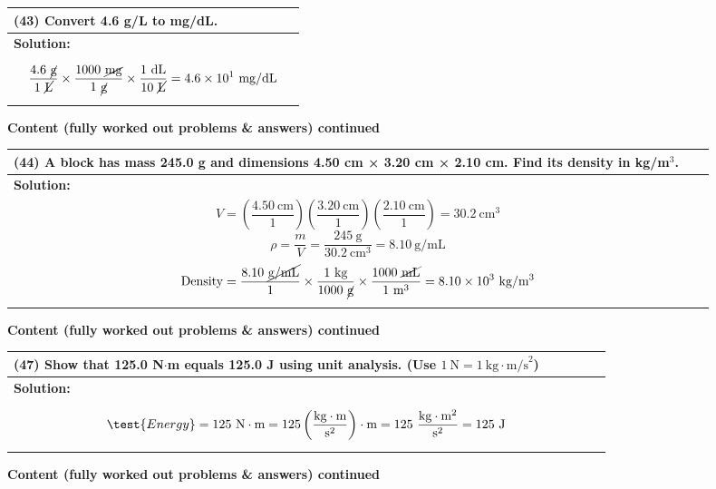\documentclass{article}
\begin{document}
\begin{tabular}{|p{0.9\linewidth}|}
\hline
\vspace{0.2cm}

\textbf{(43)} Convert 4.6 g/L to mg/dL. \\
\hline
\textbf{Solution:} \\
\[
\frac{4.6~\cancel{\text{g}}}{1~\cancel{\text{L}}} \times \frac{1000~\cancel{\text{mg}}}{1~\cancel{\text{g}}} \times \frac{1~\text{dL}}{10~\cancel{\text{L}}} = 4.6 \times 10^1~\text{mg/dL}
\]
\\
\hline
\end{tabular}
\newpage
\noindent
{\large \textbf{Content (fully worked out problems \& answers) continued}} \\[0.2em]
\begin{tabular}{|p{0.9\linewidth}|}
\hline
\vspace{0.2cm}

\textbf{(44)} A block has mass 245.0 g and dimensions 4.50 cm × 3.20 cm × 2.10 cm. Find its density in kg/m$^3$. \\
\hline
\textbf{Solution:} \\
\[
V=\left(\frac{4.50~\text{cm}}{1}\right)\left(\frac{3.20~\text{cm}}{1}\right)\left(\frac{2.10~\text{cm}}{1}\right)=30.2~\text{cm}^3
\]
\[
\rho=\frac{m}{V}=\frac{245~\text{g}}{30.2~\text{cm}^3}=8.10~\text{g/mL}
\]
\[
\text{Density} = \frac{8.10~\cancel{\text{g/mL}}}{1} \times \frac{1~\text{kg}}{1000~\cancel{\text{g}}} \times \frac{1000~\cancel{\text{mL}}}{1~\text{m}^3} = 8.10 \times 10^3~\text{kg}/{\text{m}^3}
\]
\\
\hline
\end{tabular}
\newpage
\noindent
{\large \textbf{Content (fully worked out problems \& answers) continued}} \\[0.2em]
\begin{tabular}{|p{0.9\linewidth}|}
\hline
\vspace{0.2cm}

\textbf{(47)} Show that 125.0 N$\cdot$m equals 125.0 J using unit analysis. (Use $1~\text{N}=1~\text{kg}\cdot\text{m/s}^2$) \\
\hline
\textbf{Solution:} \\
\[
\test{Energy} = 125~\text{N}\cdot\text{m} = 125\left(\frac{\text{kg}\cdot\text{m}}{\text{s}^2}\right)\cdot \text{m} = 125~\frac{\text{kg}\cdot\text{m}^2}{\text{s}^2} = 125~\text{J}
\]
\\
\hline
\end{tabular}
\newpage
\noindent
{\large \textbf{Content (fully worked out problems \& answers) continued}} \\[0.2em]
\end{document}
